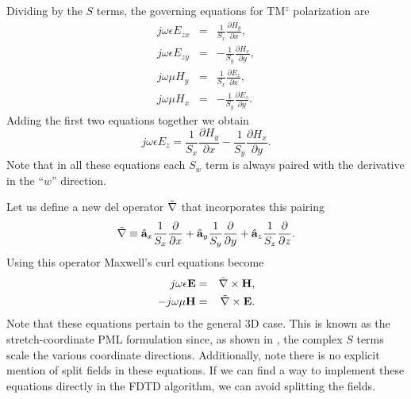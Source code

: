 Dividing by the $S$ terms, the governing equations for TM$^z$
polarization are
\begin{eqnarray}
  j\omega\epsilon E_{zx} &=& 
    \frac{1}{S_x}\frac{\partial H_y}{\partial x}, \\
  j\omega\epsilon E_{zy} &=& 
    -\frac{1}{S_y}\frac{\partial H_x}{\partial y}, \\
  j\omega\mu H_y &=& 
    \frac{1}{S_x}\frac{\partial E_z}{\partial x},\\
  j\omega\mu H_x &=& 
    -\frac{1}{S_y}\frac{\partial E_z}{\partial y}.
\end{eqnarray}
Adding the first two equations together we obtain
\begin{equation}
  j\omega\epsilon E_z =
    \frac{1}{S_x}\frac{\partial H_y}{\partial x}
    -\frac{1}{S_y}\frac{\partial H_x}{\partial y}.
\end{equation}
Note that in all these equations each $S_w$ term is always paired
with the derivative in the ``$w$'' direction.

Let us define a new del operator $\tilde{\nabla}$ that incorporates this
pairing
\begin{equation}
  \tilde{\nabla} \equiv \hat{\mathbf{a}}_{x} \frac{1}{S_x}\frac{\partial}{\partial x}
   + \hat{\mathbf{a}}_{y} \frac{1}{S_y}\frac{\partial}{\partial y}
   + \hat{\mathbf{a}}_{z} \frac{1}{S_z}\frac{\partial}{\partial z}.
  \label{eq:nabpml}
\end{equation}
Using this operator Maxwell's curl equations become
\begin{eqnarray}
 j\omega\epsilon\mathbf{E} &=& \tilde{\nabla}\times\mathbf{H}, 
   \label{eq:curlEStretched}
\\
 -j\omega\mu\mathbf{H} &=& \tilde{\nabla}\times\mathbf{E}.
   \label{eq:curlHStretched}
\end{eqnarray}
Note that these equations pertain to the general 3D case.  This is
known as the stretch-coordinate PML formulation since, as shown in
, the complex $S$ terms scale the various coordinate
directions.  Additionally, note there is no explicit mention of split
fields in these equations.  If we can find a way to implement these
equations directly in the FDTD algorithm, we can avoid splitting the
fields.

